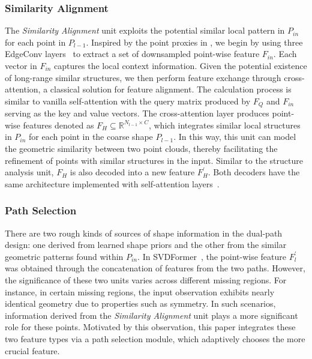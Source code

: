 \subsubsection{Similarity Alignment}
The \emph{Similarity Alignment} unit exploits the potential similar local pattern in $P_{in}$ for each point in $P_{l-1}$. 
Inspired by the point proxies in \cite{yu2021pointr}, we begin by using three EdgeConv layers~\citep{wang2019dynamic} to extract a set of downsampled point-wise feature $F_{in}$. Each vector in $F_{in}$ captures the local context information.
Given the potential existence of long-range similar structures, we then perform feature exchange through cross-attention, a classical solution for feature alignment.
The calculation process is similar to vanilla self-attention with the query matrix produced by $F_Q$ and $F_{in}$ serving as the key and value vectors.
The cross-attention layer produces point-wise features denoted as $F_H\subseteq\mathbb{R}^{N_{l-1}\times C}$, which integrates similar local structures in $P_{in}$ for each point in the coarse shape $P_{l-1}$. 
In this way, this unit can model the geometric similarity between two point clouds, thereby facilitating the refinement of points with similar structures in the input. 
Similar to the structure analysis unit, $F_H$ is also decoded into a new feature $F_{H}^{\prime}$. Both decoders have the same architecture implemented with self-attention layers~\citep{vaswani2017attention}.


\subsubsection{Path Selection}
There are two rough kinds of sources of shape information in the dual-path design: one derived from learned shape priors and the other from the similar geometric patterns found within $P_{in}$. 
In SVDFormer~\citep{Zhu_2023_ICCV}, the point-wise feature $F_{l}^{\prime}$ was obtained through the concatenation of features from the two paths. 
However, the significance of these two units varies across different missing regions. For instance, in certain missing regions, the input observation exhibits nearly identical geometry due to properties such as symmetry. In such scenarios, information derived from the \emph{Similarity Alignment} unit plays a more significant role for these points. Motivated by this observation, this paper integrates these two feature types via a path selection module, which adaptively chooses the more crucial feature. 

